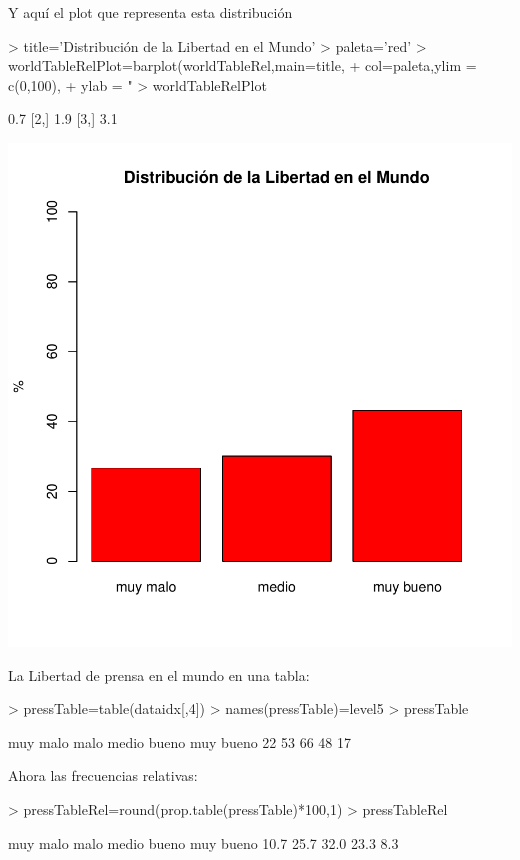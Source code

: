 \documentclass{article}
\begin{document}
Y aquí el plot que representa esta distribución
\begin{Schunk}
\begin{Sinput}
> title='Distribución de la Libertad en el Mundo'
> paleta='red'
> worldTableRelPlot=barplot(worldTableRel,main=title,
+                           col=paleta,ylim = c(0,100),
+                           ylab = "%
> worldTableRelPlot
\end{Sinput}
\begin{Soutput}
     [,1]
[1,]  0.7
[2,]  1.9
[3,]  3.1
\end{Soutput}
\end{Schunk}
\includegraphics{version_0-worldTableRelPlot}


La Libertad de prensa en el mundo en una tabla:
\begin{Schunk}
\begin{Sinput}
> pressTable=table(dataidx[,4])
> names(pressTable)=level5
> pressTable
\end{Sinput}
\begin{Soutput}
 muy malo      malo     medio     bueno muy bueno 
       22        53        66        48        17 
\end{Soutput}
\end{Schunk}


Ahora las frecuencias relativas:
\begin{Schunk}
\begin{Sinput}
> pressTableRel=round(prop.table(pressTable)*100,1)
> pressTableRel
\end{Sinput}
\begin{Soutput}
 muy malo      malo     medio     bueno muy bueno 
     10.7      25.7      32.0      23.3       8.3 
\end{Soutput}
\end{Schunk}
\end{document}
